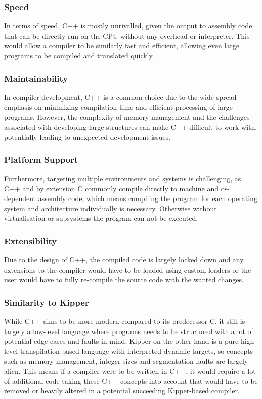 \subsubsection{Speed}

In terms of speed, C++ is mostly unrivalled, given the output to assembly code that can be directly run on the CPU without any overhead or interpreter. This would allow a compiler to be similarly fast and efficient, allowing even large programs to be compiled and translated quickly.

\subsubsection{Maintainability}

In compiler development, C++ is a common choice due to the wide-spread emphasis on minimizing compilation time and efficient processing of large programs. However, the complexity of memory management and the challenges associated with developing large structures can make C++ difficult to work with, potentially leading to unexpected development issues.

\subsubsection{Platform Support}

Furthermore, targeting multiple environments and systems is challenging, as C++ and by extension C commonly compile directly to machine and os-dependent assembly code, which means compiling the program for each operating system and architecture individually is necessary. Otherwise without virtualisation or subsystems the program can not be executed.

\subsubsection{Extensibility}

Due to the design of C++, the compiled code is largely locked down and any extensions to the compiler would have to be loaded using custom loaders or the user would have to fully re-compile the source code with the wanted changes.

\subsubsection{Similarity to Kipper}

While C++ aims to be more modern compared to its predecessor C, it still is largely a low-level language where programs needs to be structured with a lot of potential edge cases and faults in mind. Kipper on the other hand is a pure high-level \gls{transpilation}-based language with interpreted dynamic targets, so concepts such as memory management, integer sizes and segmentation faults are largely alien. This means if a compiler were to be written in C++, it would require a lot of additional code taking these C++ concepts into account that would have to be removed or heavily altered in a potential succeeding Kipper-based compiler.


